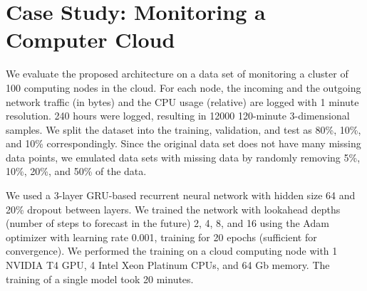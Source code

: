 \documentclass[runningheads]{llncs}
\begin{document}
\section{Case Study: Monitoring a Computer Cloud}

We evaluate the proposed architecture on a data set of
monitoring a cluster of 100 computing nodes in the cloud. For
each node, the incoming and the outgoing network traffic (in
bytes) and the CPU usage (relative) are logged with 1 minute
resolution. 240 hours were logged, resulting in 12000 120-minute
3-dimensional samples.  We split the dataset into the training,
validation, and test as 80\%, 10\%, and 10\% correspondingly.
Since the original data set does not have many missing data
points, we emulated data sets with missing data by randomly
removing 5\%, 10\%, 20\%, and 50\% of the data.

We used a 3-layer GRU-based recurrent neural network with hidden
size 64 and 20\% dropout between layers. We trained the network
with lookahead depths (number of steps to forecast in the
future) 2, 4, 8, and 16 using the Adam optimizer with learning
rate 0.001, training for 20 epochs (sufficient for convergence).
We performed the training on a cloud computing node with 1
NVIDIA T4 GPU, 4 Intel Xeon Platinum CPUs, and 64 Gb memory. The
training of a single model took 20 minutes.
\end{document}
